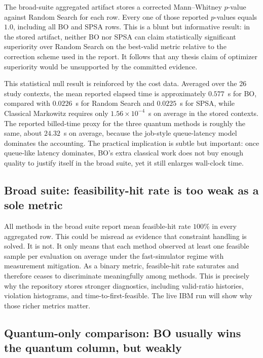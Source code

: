 \documentclass[11pt]{article}
\begin{document}
The broad-suite aggregated artifact stores a corrected Mann--Whitney \(p\)-value against Random Search for each row. Every one of those reported \(p\)-values equals \(1.0\), including all BO and SPSA rows. This is a blunt but informative result: in the stored artifact, neither BO nor SPSA can claim statistically significant superiority over Random Search on the best-valid metric relative to the correction scheme used in the report. It follows that any thesis claim of optimizer superiority would be unsupported by the committed evidence.

This statistical null result is reinforced by the cost data. Averaged over the 26 study contexts, the mean reported elapsed time is approximately \(0.577\)~s for BO, compared with \(0.0226\)~s for Random Search and \(0.0225\)~s for SPSA, while Classical Markowitz requires only \(1.56\times 10^{-4}\)~s on average in the stored contexts. The reported billed-time proxy for the three quantum methods is roughly the same, about \(24.32\)~s on average, because the job-style queue-latency model dominates the accounting. The practical implication is subtle but important: once queue-like latency dominates, BO's extra classical work does not buy enough quality to justify itself in the broad suite, yet it still enlarges wall-clock time.

\subsection{Broad suite: feasibility-hit rate is too weak as a sole metric}

All methods in the broad suite report mean feasible-hit rate \(100\%\) in every aggregated row. This could be misread as evidence that constraint handling is solved. It is not. It only means that each method observed at least one feasible sample per evaluation on average under the fast-simulator regime with measurement mitigation. As a binary metric, feasible-hit rate saturates and therefore ceases to discriminate meaningfully among methods. This is precisely why the repository stores stronger diagnostics, including valid-ratio histories, violation histograms, and time-to-first-feasible. The live IBM run will show why those richer metrics matter.

\subsection{Quantum-only comparison: BO usually wins the quantum column, but weakly}
\end{document}
